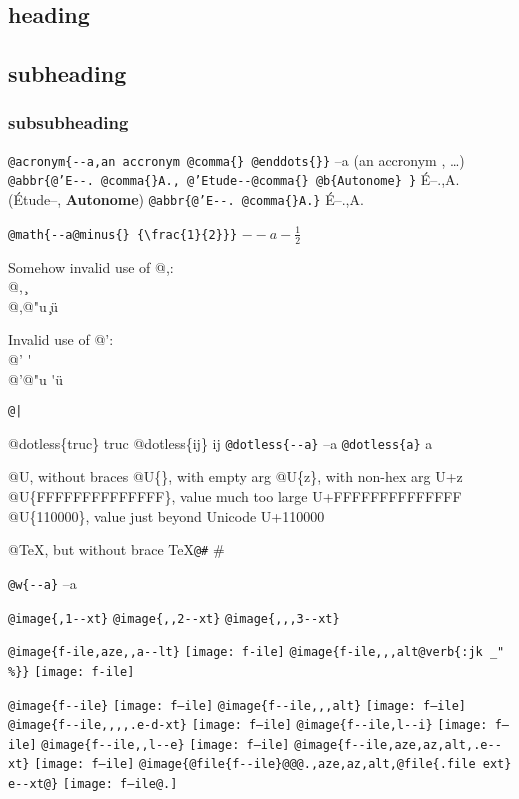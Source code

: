 \documentclass{book}
\newcommand{\GNUTexinfoplaceholder}[1]{}
\newcommand{\GNUTexinfonopagebreakheading}[2]{\let\clearpage\relax \let\cleardoublepage\relax \let\thispagestyle\GNUTexinfoplaceholder #1{#2}}
\renewcommand{\includegraphics}[1]{\fbox{FIG #1}}
\begin{document}
\begin{titlepage}
\GNUTexinfonopagebreakheading{\section*}{heading}

\GNUTexinfonopagebreakheading{\subsection*}{subheading}

\GNUTexinfonopagebreakheading{\subsubsection*}{subsubheading}


\texttt{@acronym\{{-}{-}a,an accronym @comma\{\} @enddots\{\}\}} --a (an accronym , \dots{})
\texttt{@abbr\{@'E{-}{-}. @comma\{\}A., @'Etude{-}{-}@comma\{\} @b\{Autonome\} \}} \'{E}--.\@ ,A.\@ (\'{E}tude--, \textbf{Autonome})
\texttt{@abbr\{@'E{-}{-}. @comma\{\}A.\}} \'{E}--.\@ ,A.\@

\texttt{@math\{{-}{-}a@minus\{\} \{\textbackslash{}frac\{1\}\{2\}\}\}} $--a- {\frac{1}{2}}$




Somehow invalid use of @,:\leavevmode{}\\
@, \c{}
\leavevmode{}\\
@,@"u \c{}\"{u}

Invalid use of @':\leavevmode{}\\
@' \'{}
\leavevmode{}\\
@'@"u \'{}\"{u}

\texttt{@|} 

@dotless\{truc\} truc
@dotless\{ij\} ij
\texttt{@dotless\{{-}{-}a\}} --a
\texttt{@dotless\{a\}} a

@U, without braces @U\{\}, with empty arg 
@U\{z\}, with non-hex arg U+z
@U\{FFFFFFFFFFFFFF\}, value much too large U+FFFFFFFFFFFFFF
@U\{110000\}, value just beyond Unicode U+110000

@TeX, but without brace \TeX{}\texttt{@\#} \#

\texttt{@w\{{-}{-}a\}} \hbox{--a}

\texttt{@image\{,1{-}{-}xt\}} 
\texttt{@image\{,,2{-}{-}xt\}} 
\texttt{@image\{,,,3{-}{-}xt\}} 

\texttt{@image\{f-ile,aze,,a{-}{-}lt\}} \texttt{[image: f-ile]}
\texttt{@image\{f-ile,,,alt@verb\{:jk \_" \%\@\}\}} \texttt{[image: f-ile]}

\texttt{@image\{f{-}{-}ile\}} \texttt{[image: f--ile]}
\texttt{@image\{f{-}{-}ile,,,alt\}} \texttt{[image: f--ile]}
\texttt{@image\{f{-}{-}ile,,,,.e-d-xt\}} \texttt{[image: f--ile]}
\texttt{@image\{f{-}{-}ile,l{-}{-}i\}} \texttt{[image: f--ile]}
\texttt{@image\{f{-}{-}ile,,l{-}{-}e\}} \texttt{[image: f--ile]}
\texttt{@image\{f{-}{-}ile,aze,az,alt,.e{-}{-}xt\}} \texttt{[image: f--ile]}
\texttt{@image\{@file\{f{-}{-}ile\}@@@.,aze,az,alt,@file\{.file ext\} e{-}{-}xt@\}} \texttt{[image: f--ile@.]}


\end{titlepage}
\end{document}
